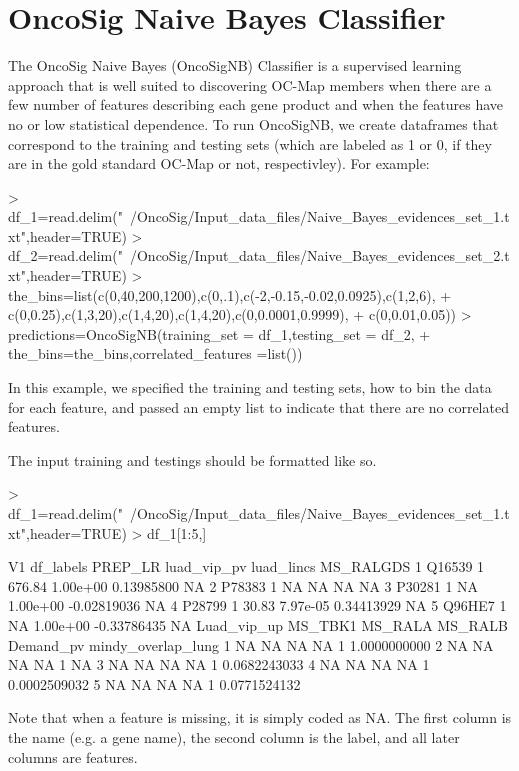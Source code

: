 \documentclass{article}
\begin{document}
\section*{OncoSig Naive Bayes Classifier}
The OncoSig Naive Bayes (OncoSigNB) Classifier is a supervised learning approach that is well suited to discovering OC-Map members when there are a few number of features describing each gene product and when the features have no or low statistical dependence. To run OncoSigNB, we create dataframes that correspond to the training and testing sets (which are labeled as 1 or 0, if they are in the gold standard OC-Map or not, respectivley).
For example:

\begin{Schunk}
\begin{Sinput}
> df_1=read.delim("~/OncoSig/Input_data_files/Naive_Bayes_evidences_set_1.txt",header=TRUE)
> df_2=read.delim("~/OncoSig/Input_data_files/Naive_Bayes_evidences_set_2.txt",header=TRUE)
> the_bins=list(c(0,40,200,1200),c(0,.1),c(-2,-0.15,-0.02,0.0925),c(1,2,6),
+               c(0,0.25),c(1,3,20),c(1,4,20),c(1,4,20),c(0,0.0001,0.9999),
+               c(0,0.01,0.05))
> predictions=OncoSigNB(training_set = df_1,testing_set = df_2,
+                       the_bins=the_bins,correlated_features =list())
\end{Sinput}
\end{Schunk}

In this example, we specified the training and testing sets, how to bin the data for each feature, and passed an empty list to indicate that there are no correlated features.

The input training and testings should be formatted like so.
\begin{Schunk}
\begin{Sinput}
> df_1=read.delim("~/OncoSig/Input_data_files/Naive_Bayes_evidences_set_1.txt",header=TRUE)
> df_1[1:5,]
\end{Sinput}
\begin{Soutput}
      V1 df_labels PREP_LR luad_vip_pv  luad_lincs MS_RALGDS
1 Q16539         1  676.84    1.00e+00  0.13985800        NA
2 P78383         1      NA          NA          NA        NA
3 P30281         1      NA    1.00e+00 -0.02819036        NA
4 P28799         1   30.83    7.97e-05  0.34413929        NA
5 Q96HE7         1      NA    1.00e+00 -0.33786435        NA
  Luad_vip_up MS_TBK1 MS_RALA MS_RALB Demand_pv mindy_overlap_lung
1          NA      NA      NA      NA         1       1.0000000000
2          NA      NA      NA      NA         1                 NA
3          NA      NA      NA      NA         1       0.0682243033
4          NA      NA      NA      NA         1       0.0002509032
5          NA      NA      NA      NA         1       0.0771524132
\end{Soutput}
\end{Schunk}
Note that when a feature is missing, it is simply coded as NA. The first column is the name (e.g. a gene name), the second column is the label, and all later columns are features.
\end{document}
